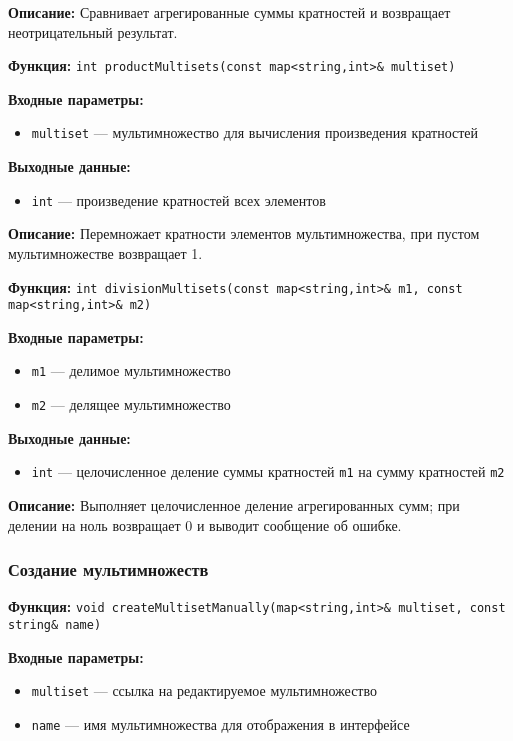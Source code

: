 \documentclass[12pt,a4paper]{article}
\begin{document}
\textbf{Описание:} Сравнивает агрегированные суммы кратностей и возвращает неотрицательный результат.

\vspace{6pt}

\textbf{Функция:} \texttt{int productMultisets(const map<string,int>\& multiset)}

\textbf{Входные параметры:}
\begin{itemize}
    \item \texttt{multiset} — мультимножество для вычисления произведения кратностей
\end{itemize}

\textbf{Выходные данные:}
\begin{itemize}
    \item \texttt{int} — произведение кратностей всех элементов
\end{itemize}

\textbf{Описание:} Перемножает кратности элементов мультимножества, при пустом мультимножестве возвращает 1.

\vspace{6pt}

\textbf{Функция:} \texttt{int divisionMultisets(const map<string,int>\& m1, const map<string,int>\& m2)}

\textbf{Входные параметры:}
\begin{itemize}
    \item \texttt{m1} — делимое мультимножество
    \item \texttt{m2} — делящее мультимножество
\end{itemize}

\textbf{Выходные данные:}
\begin{itemize}
    \item \texttt{int} — целочисленное деление суммы кратностей \texttt{m1} на сумму кратностей \texttt{m2}
\end{itemize}

\textbf{Описание:} Выполняет целочисленное деление агрегированных сумм; при делении на ноль возвращает 0 и выводит сообщение об ошибке.

\subsubsection{Создание мультимножеств}

\textbf{Функция:} \texttt{void createMultisetManually(map<string,int>\& multiset, const string\& name)}

\textbf{Входные параметры:}
\begin{itemize}
    \item \texttt{multiset} — ссылка на редактируемое мультимножество
    \item \texttt{name} — имя мультимножества для отображения в интерфейсе
\end{itemize}
\end{document}
